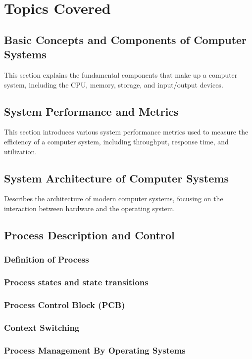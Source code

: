 \documentclass[12pt]{article}
\begin{document}
\section{Topics Covered}

\subsection{Basic Concepts and Components of Computer Systems}
This section explains the fundamental components that make up a computer system, including the CPU, memory, storage, and input/output devices.

\subsection{System Performance and Metrics}
This section introduces various system performance metrics used to measure the efficiency of a computer system, including throughput, response time, and utilization.

\subsection{System Architecture of Computer Systems}
Describes the architecture of modern computer systems, focusing on the interaction between hardware and the operating system.

\subsection{Process Description and Control}
\subsubsection{Definition of Process}
\subsubsection{Process states and state transitions}
\subsubsection{Process Control Block (PCB)}
\subsubsection{Context Switching}


\subsubsection{Process Management By Operating Systems}
\end{document}
